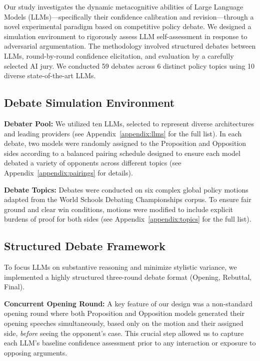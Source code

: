 \documentclass{article}
\begin{document}
Our study investigates the dynamic metacognitive abilities of Large Language Models (LLMs)---specifically their confidence calibration and revision---through a novel experimental paradigm based on competitive policy debate. We designed a simulation environment to rigorously assess LLM self-assessment in response to adversarial argumentation. The methodology involved structured debates between LLMs, round-by-round confidence elicitation, and evaluation by a carefully selected AI jury. We conducted 59 debates across 6 distinct policy topics using 10 diverse state-of-the-art LLMs.

\subsection{Debate Simulation Environment}
\label{subsec:debate_env}

\textbf{Debater Pool:} We utilized ten LLMs, selected to represent diverse architectures and leading providers (see Appendix~\ref{appendix:llms} for the full list). In each debate, two models were randomly assigned to the Proposition and Opposition sides according to a balanced pairing schedule designed to ensure each model debated a variety of opponents across different topics (see Appendix~\ref{appendix:pairings} for details).

\textbf{Debate Topics:} Debates were conducted on six complex global policy motions adapted from the World Schools Debating Championships corpus. To ensure fair ground and clear win conditions, motions were modified to include explicit burdens of proof for both sides (see Appendix~\ref{appendix:topics} for the full list).

\subsection{Structured Debate Framework}
\label{subsec:debate_framework}

To focus LLMs on substantive reasoning and minimize stylistic variance, we implemented a highly structured three-round debate format (Opening, Rebuttal, Final).

\textbf{Concurrent Opening Round:} A key feature of our design was a non-standard opening round where both Proposition and Opposition models generated their opening speeches simultaneously, based only on the motion and their assigned side, \textit{before} seeing the opponent's case. This crucial step allowed us to capture each LLM's baseline confidence assessment prior to any interaction or exposure to opposing arguments.
\end{document}
